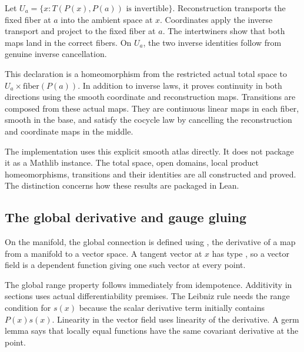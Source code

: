Let $U_a=\{x:T(P(x),P(a))\text{ is invertible}\}$. Reconstruction transports the fixed fiber at $a$ into the ambient space at $x$. Coordinates apply the inverse transport and project to the fixed fiber at $a$. The intertwiners show that both maps land in the correct fibers. On $U_a$, the two inverse identities follow from genuine inverse cancellation.


This declaration is a homeomorphism from the restricted actual total space to $U_a\times\mathrm{fiber}(P(a))$. In addition to inverse laws, it proves continuity in both directions using the smooth coordinate and reconstruction maps. Transitions are composed from these actual maps. They are continuous linear maps in each fiber, smooth in the base, and satisfy the cocycle law by cancelling the reconstruction and coordinate maps in the middle.



The implementation uses this explicit smooth atlas directly. It does not package it as a Mathlib  instance. The total space, open domains, local product homeomorphisms, transitions and their identities are all constructed and proved. The distinction concerns how these results are packaged in Lean.

\subsection{The global derivative and gauge gluing}
On the manifold, the global connection is defined using , the derivative of a map from a manifold to a vector space. A tangent vector at $x$ has type , so a vector field is a dependent function giving one such vector at every point.


The global range property follows immediately from idempotence. Additivity in sections uses actual differentiability premises. The Leibniz rule needs the range condition for $s(x)$ because the scalar derivative term initially contains $P(x)s(x)$. Linearity in the vector field uses linearity of the derivative. A germ lemma says that locally equal functions have the same covariant derivative at the point.

